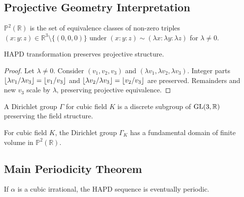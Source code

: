 \subsection{Projective Geometry Interpretation}

\begin{definition}
$\mathbb{P}^2(\mathbb{R})$ is the set of equivalence classes of non-zero triples $(x : y : z) \in \mathbb{R}^3 \setminus \{(0,0,0)\}$ under $(x : y : z) \sim (\lambda x : \lambda y : \lambda z)$ for $\lambda \neq 0$.
\end{definition}

\begin{proposition}\label{prop:projective_invariance}
HAPD transformation preserves projective structure.
\end{proposition}

\begin{proof}
Let $\lambda \neq 0$. Consider $(v_1, v_2, v_3)$ and $(\lambda v_1, \lambda v_2, \lambda v_3)$. Integer parts $\lfloor \lambda v_1/\lambda v_3 \rfloor = \lfloor v_1/v_3 \rfloor$ and $\lfloor \lambda v_2/\lambda v_3 \rfloor = \lfloor v_2/v_3 \rfloor$ are preserved. Remainders and new $v_3$ scale by $\lambda$, preserving projective equivalence.
\end{proof}

\begin{definition}
A Dirichlet group $\Gamma$ for cubic field $K$ is a discrete subgroup of $\operatorname{GL}(3,\mathbb{R})$ preserving the field structure.
\end{definition}

\begin{theorem}\label{thm:finite_domain}
For cubic field $K$, the Dirichlet group $\Gamma_K$ has a fundamental domain of finite volume in $\mathbb{P}^2(\mathbb{R})$.
\end{theorem}

\subsection{Main Periodicity Theorem}

\begin{theorem}\label{thm:cubic_periodic}
If $\alpha$ is a cubic irrational, the HAPD sequence is eventually periodic.
\end{theorem}

